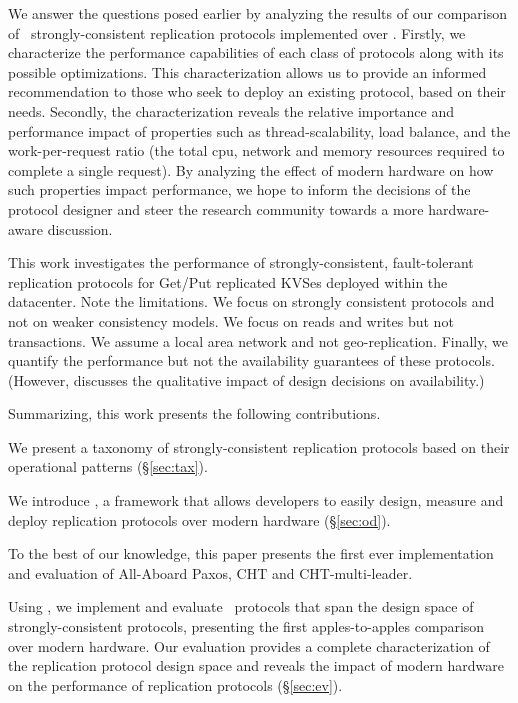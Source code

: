 We answer the questions posed earlier by analyzing the results of our
comparison of \pnum\ strongly-consistent replication protocols implemented over \odlib.
Firstly, we characterize
the performance capabilities of each class of protocols along with its possible optimizations. 
This characterization allows us to provide an informed recommendation to those who seek to deploy an existing protocol, based on their needs.
Secondly, the characterization reveals the relative importance and performance impact of properties such as thread-scalability, load balance, and the work-per-request ratio (\ie  the total cpu, network and memory resources required to complete a single request).
By analyzing the effect of modern hardware on how such properties impact performance, we hope to inform the decisions of the protocol designer and steer the research community towards a more hardware-aware discussion.



This work investigates the performance of strongly-consistent, fault-tolerant replication protocols for Get/Put replicated KVSes deployed within the datacenter. Note the limitations. We focus on strongly consistent protocols and not on weaker consistency models. We focus on reads and writes but not transactions. We assume a local area network and not geo-replication. Finally, we quantify the performance but not the availability guarantees of these protocols. (However,  discusses the qualitative impact of design decisions on availability.)


 Summarizing, this work presents the following contributions.
\squishlistContrib
\item We present a taxonomy of strongly-consistent replication protocols based on their operational patterns (\S\ref{sec:tax}).
\item We introduce \odlib, a framework that allows developers to  
easily design, measure and deploy replication protocols over modern hardware (\S\ref{sec:od}).
\item To the best of our knowledge, this paper presents the first ever implementation and evaluation of All-Aboard Paxos, CHT and CHT-multi-leader. 
\item Using \odlib, we implement and evaluate \pnum~protocols that  
span the design space of strongly-consistent protocols, presenting the first  
apples-to-apples comparison over modern hardware.
Our evaluation provides a complete characterization of the replication protocol design space and reveals the impact of modern hardware on the performance of replication protocols (\S\ref{sec:ev}).



